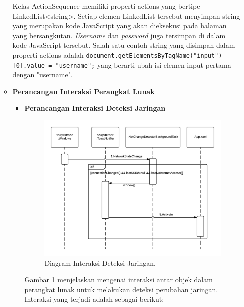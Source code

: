 \documentclass[a4paper,twoside]{article}
\begin{document}
\begin{enumerate}
\begin{itemize}
{\begin{itemize}
{Kelas ActionSequence memiliki properti actions yang bertipe LinkedList<string>. Setiap elemen LinkedList tersebut menyimpan string yang merupakan kode JavaScript yang akan dieksekusi pada halaman yang bersangkutan. \textit{Username} dan \textit{password} juga tersimpan di dalam kode JavaScript tersebut. Salah satu contoh string yang disimpan dalam properti actions adalah \texttt{document.getElementsByTagName("input")[0].value = "username";} yang berarti ubah isi elemen input pertama dengan "username".
                    }
                \end{itemize}
            }
            \item{
                {\bf Perancangan Interaksi Perangkat Lunak}
                \begin{itemize}
                    \item{
                        {\bf Perancangan Interaksi Deteksi Jaringan}\\
                        \begin{figure}[!htb]
                            \centering
                            \includegraphics[scale=0.9]{SequenceDiagramNetworkDetection.png}
                            \caption[Diagram Interaksi Deteksi Jaringan.]{Diagram Interaksi Deteksi Jaringan.} 
                            \label{fig:NetworkDetectionSequenceDiagram}
                        \end{figure}
                        Gambar \ref{fig:NetworkDetectionSequenceDiagram} menjelaskan mengenai interaksi antar objek dalam perangkat lunak untuk melakukan deteksi perubahan jaringan. Interaksi yang terjadi adalah sebagai berikut:

}
\end{itemize}}
\end{itemize}
\end{enumerate}
\end{document}
